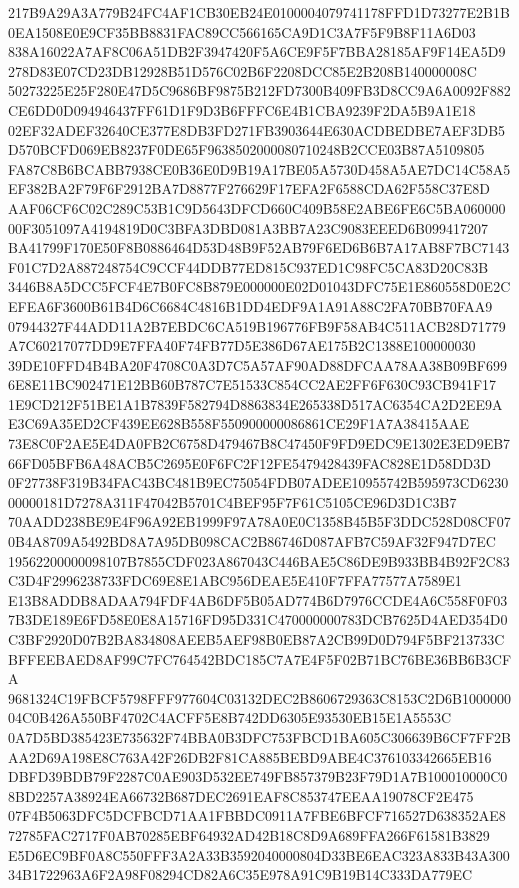 \documentclass[UTF8,fontset=fandol,zihao=-4,a4paper]{ctexart}
\begin{document}
{{217B9A29A3A779B24FC4AF1CB30EB24E0100004079741178FFD1D73277E2B1B0EA1508E0E9CF35BB8831FAC89CC566165CA9D1C3A7F5F9B8F11A6D03
838A16022A7AF8C06A51DB2F3947420F5A6CE9F5F7BBA28185AF9F14EA5D9278D83E07CD23DB12928B51D576C02B6F2208DCC85E2B208B140000008C
50273225E25F280E47D5C9686BF9875B212FD7300B409FB3D8CC9A6A0092F882CE6DD0D094946437FF61D1F9D3B6FFFC6E4B1CBA9239F2DA5B9A1E18
02EF32ADEF32640CE377E8DB3FD271FB3903644E630ACDBEDBE7AEF3DB5D570BCFD069EB8237F0DE65F9638502000080710248B2CCE03B87A5109805
FA87C8B6BCABB7938CE0B36E0D9B19A17BE05A5730D458A5AE7DC14C58A5EF382BA2F79F6F2912BA7D8877F276629F17EFA2F6588CDA62F558C37E8D
AAF06CF6C02C289C53B1C9D5643DFCD660C409B58E2ABE6FE6C5BA06000000F3051097A4194819D0C3BFA3DBD081A3BB7A23C9083EEED6B099417207
BA41799F170E50F8B0886464D53D48B9F52AB79F6ED6B6B7A17AB8F7BC7143F01C7D2A887248754C9CCF44DDB77ED815C937ED1C98FC5CA83D20C83B
3446B8A5DCC5FCF4E7B0FC8B879E000000E02D01043DFC75E1E860558D0E2CEFEA6F3600B61B4D6C6684C4816B1DD4EDF9A1A91A88C2FA70BB70FAA9
07944327F44ADD11A2B7EBDC6CA519B196776FB9F58AB4C511ACB28D71779A7C60217077DD9E7FFA40F74FB77D5E386D67AE175B2C1388E100000030
39DE10FFD4B4BA20F4708C0A3D7C5A57AF90AD88DFCAA78AA38B09BF6996E8E11BC902471E12BB60B787C7E51533C854CC2AE2FF6F630C93CB941F17
1E9CD212F51BE1A1B7839F582794D8863834E265338D517AC6354CA2D2EE9AE3C69A35ED2CF439EE628B558F550900000086861CE29F1A7A38415AAE
73E8C0F2AE5E4DA0FB2C6758D479467B8C47450F9FD9EDC9E1302E3ED9EB766FD05BFB6A48ACB5C2695E0F6FC2F12FE5479428439FAC828E1D58DD3D
0F27738F319B34FAC43BC481B9EC75054FDB07ADEE10955742B595973CD623000000181D7278A311F47042B5701C4BEF95F7F61C5105CE96D3D1C3B7
70AADD238BE9E4F96A92EB1999F97A78A0E0C1358B45B5F3DDC528D08CF070B4A8709A5492BD8A7A95DB098CAC2B86746D087AFB7C59AF32F947D7EC
19562200000098107B7855CDF023A867043C446BAE5C86DE9B933BB4B92F2C83C3D4F2996238733FDC69E8E1ABC956DEAE5E410F7FFA77577A7589E1
E13B8ADDB8ADAA794FDF4AB6DF5B05AD774B6D7976CCDE4A6C558F0F037B3DE189E6FD58E0E8A15716FD95D331C470000000783DCB7625D4AED354D0
C3BF2920D07B2BA834808AEEB5AEF98B0EB87A2CB99D0D794F5BF213733CBFFEEBAED8AF99C7FC764542BDC185C7A7E4F5F02B71BC76BE36BB6B3CFA
9681324C19FBCF5798FFF977604C03132DEC2B8606729363C8153C2D6B100000004C0B426A550BF4702C4ACFF5E8B742DD6305E93530EB15E1A5553C
0A7D5BD385423E735632F74BBA0B3DFC753FBCD1BA605C306639B6CF7FF2BAA2D69A198E8C763A42F26DB2F81CA885BEBD9ABE4C376103342665EB16
DBFD39BDB79F2287C0AE903D532EE749FB857379B23F79D1A7B100010000C08BD2257A38924EA66732B687DEC2691EAF8C853747EEAA19078CF2E475
07F4B5063DFC5DCFBCD71AA1FBBDC0911A7FBE6BFCF716527D638352AE872785FAC2717F0AB70285EBF64932AD42B18C8D9A689FFA266F61581B3829
E5D6EC9BF0A8C550FFF3A2A33B3592040000804D33BE6EAC323A833B43A30034B1722963A6F2A98F08294CD82A6C35E978A91C9B19B14C333DA779EC
}}
\end{document}
